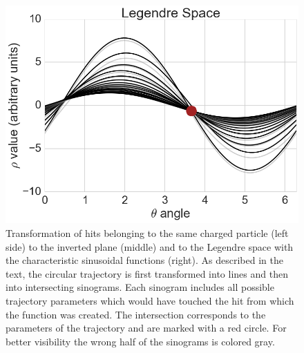 \begin{figure}
 \vspace*{1cm}
 \includegraphics[scale=0.3]{figures/theory/legendre_3.png}
 \caption[Axial Legendre algorithm.]{Transformation of hits belonging to the same charged particle (left side) to the inverted plane (middle) and to the Legendre space with the characteristic sinusoidal functions (right). As described in the text, the circular trajectory is first transformed into lines and then into intersecting sinograms. Each sinogram includes all possible trajectory parameters which would have touched the hit from which the function was created. The intersection corresponds to the parameters of the trajectory and are marked with a red circle. For better visibility the wrong half of the sinograms is colored gray.}
 \label{fig-legendre-explained}
\end{figure}

